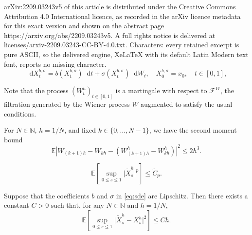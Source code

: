 \documentclass[10pt,a4paper]{amsart}
\def\E{{\mathbb E}}
\newcommand{\N}{\mathbb N}
\newcommand{\di}{\mathop{}\!\mathrm{d}}
\newcommand{\dt}{\mathop{}\!\mathrm{d}t}
\begin{document}
arXiv:2209.03243v5 of this article is distributed under the Creative Commons Attribution 4.0 International licence, as recorded in the arXiv licence metadata for this exact version and shown on the abstract page https://arxiv.org/abs/2209.03243v5. A full rights notice is delivered at licenses/arxiv-2209.03243-CC-BY-4.0.txt. Characters: every retained excerpt is pure ASCII, so the delivered engine, XeLaTeX with its default Latin Modern text font, reports no missing character.
\begin{equation}\label{eq:sde}
	\di X^{b,\sigma}_t=b(X^{b,\sigma}_t)\dt+\sigma(X^{b,\sigma}_t)\di W_t,
	\quad X^{b,\sigma}_0=x_0,
	\quad t \in [0, 1],
\end{equation}

\begin{remark}\label{rem:truncated-bm-martingale}
	Note that the process $(W^h_t)_{t \in [0, 1]}$ is a martingale with respect to $\mathcal{F}^W$, the filtration generated by the Wiener process $W$ augmented to satisfy the usual conditions.
\end{remark}

\begin{lemma}\label{lem:truncated-BM}
	For $N \in \N$, $h = 1/N$, and fixed $k \in \{0, \dotsc, N-1\}$,  we have the second moment bound
	\begin{equation}
		\E \!\left \lvert W_{{(k+1)h}} - W_{{kh}} - (W^h_{{(k+1)h}} - W^h_{{kh}}) \right \rvert^2 \le 2 h^{3}.
	\end{equation}
\end{lemma}

\begin{equation}\label{eq:euler-l2-bound}
	\E \!\left[ \sup_{0 \leq s \leq 1} \lvert \tilde{X}^h_s\rvert^p\right] \leq \tilde{C}_p.
\end{equation}

\begin{proposition}\label{prop:truncated-euler-close-to-euler}
	Suppose that the coefficients $b$ and $\sigma$ in \eqref{eq:sde} are Lipschitz. Then there exists a constant $C > 0$ such that, for any $N \in \N$ and $h = 1/N$,
	\begin{equation}
		\E \!\left[\sup_{0 \leq s \leq 1} \lvert \tilde{X}^h_s - X^h_s\rvert^2\right] \leq C h.
	\end{equation}
\end{proposition}
\end{document}
